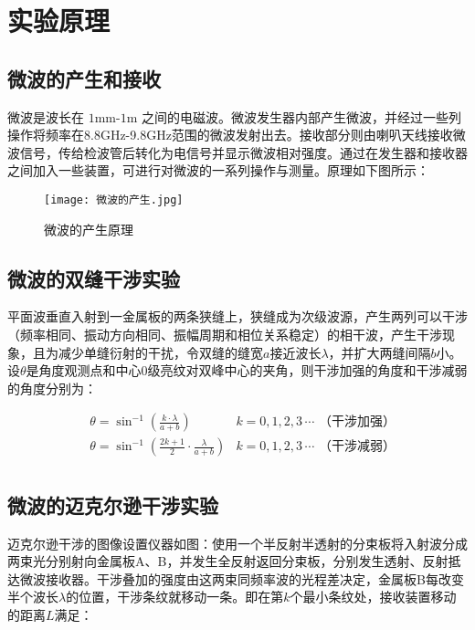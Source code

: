 \documentclass[11pt]{article}
\begin{document}
\section{实验原理}

\subsection{微波的产生和接收}

微波是波长在 $1$mm-$1$m 之间的电磁波。微波发生器内部产生微波，并经过一些列操作将频率在8.8GHz-9.8GHz范围的微波发射出去。接收部分则由喇叭天线接收微波信号，传给检波管后转化为电信号并显示微波相对强度。通过在发生器和接收器之间加入一些装置，可进行对微波的一系列操作与测量。原理如下图所示：

\begin{figure}[H]
	\centering
	\texttt{[image: 微波的产生.jpg]}
	\caption{微波的产生原理}
\end{figure}

\subsection{微波的双缝干涉实验}

平面波垂直入射到一金属板的两条狭缝上，狭缝成为次级波源，产生两列可以干涉（频率相同、振动方向相同、振幅周期和相位关系稳定）的相干波，产生干涉现象，且为减少单缝衍射的干扰，令双缝的缝宽$a$接近波长$\lambda$，并扩大两缝间隔$b$小。设$\theta$是角度观测点和中心$0$级亮纹对双峰中心的夹角，则干涉加强的角度和干涉减弱的角度分别为：

\begin{align*}
	&\theta = \sin^{-1}{\left( \frac{k\cdot\lambda}{a+b} \right)} &k=0,1,2,3\,\cdots \text{ （干涉加强）} \\
	&\theta = \sin^{-1}{\left( \frac{2k+1}{2}\cdot\frac{\lambda}{a+b} \right)} &k=0,1,2,3\,\cdots \text{ （干涉减弱）} \\
\end{align*}

\subsection{微波的迈克尔逊干涉实验}

迈克尔逊干涉的图像设置仪器如图：使用一个半反射半透射的分束板将入射波分成两束光分别射向金属板A、B，并发生全反射返回分束板，分别发生透射、反射抵达微波接收器。干涉叠加的强度由这两束同频率波的光程差决定，金属板B每改变半个波长$\lambda$的位置，干涉条纹就移动一条。即在第$k$个最小条纹处，接收装置移动的距离$L$满足：
\end{document}
